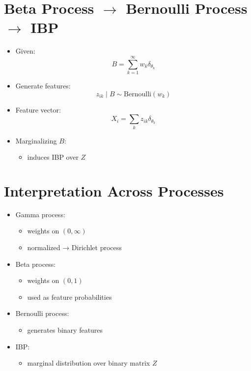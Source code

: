 \documentclass[12pt,oneside]{book}
\numberwithin{equation}{section}
\theoremstyle{definition}
\theoremstyle{plain}
\theoremstyle{remark}
\begin{document}
\section*{Beta Process $\rightarrow$ Bernoulli Process $\rightarrow$ IBP}

\begin{itemize}
\item Given:
\[
B = \sum_{k=1}^\infty w_k \delta_{\theta_k}
\]

\item Generate features:
\[
z_{ik} \mid B \sim \text{Bernoulli}(w_k)
\]

\item Feature vector:
\[
X_i = \sum_k z_{ik} \delta_{\theta_k}
\]

\item Marginalizing $B$:
\begin{itemize}
\item induces IBP over $Z$
\end{itemize}
\end{itemize}

\section{Interpretation Across Processes}

\begin{itemize}
\item Gamma process:
\begin{itemize}
\item weights on $(0,\infty)$
\item normalized → Dirichlet process
\end{itemize}

\item Beta process:
\begin{itemize}
\item weights on $(0,1)$
\item used as feature probabilities
\end{itemize}

\item Bernoulli process:
\begin{itemize}
\item generates binary features
\end{itemize}

\item IBP:
\begin{itemize}
\item marginal distribution over binary matrix $Z$
\end{itemize}
\end{itemize}
\end{document}
